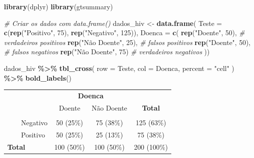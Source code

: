 \documentclass[
]{book}
\newenvironment{Shaded}{\begin{snugshade}}{\end{snugshade}}
\newcommand{\AttributeTok}[1]{\textcolor[rgb]{0.13,0.29,0.53}{#1}}
\newcommand{\CommentTok}[1]{\textcolor[rgb]{0.56,0.35,0.01}{\textit{#1}}}
\newcommand{\DecValTok}[1]{\textcolor[rgb]{0.00,0.00,0.81}{#1}}
\newcommand{\FunctionTok}[1]{\textcolor[rgb]{0.13,0.29,0.53}{\textbf{#1}}}
\newcommand{\NormalTok}[1]{#1}
\newcommand{\OtherTok}[1]{\textcolor[rgb]{0.56,0.35,0.01}{#1}}
\newcommand{\SpecialCharTok}[1]{\textcolor[rgb]{0.81,0.36,0.00}{\textbf{#1}}}
\newcommand{\StringTok}[1]{\textcolor[rgb]{0.31,0.60,0.02}{#1}}
\begin{document}
\begin{Shaded}
\begin{Highlighting}[]
\FunctionTok{library}\NormalTok{(dplyr)}
\FunctionTok{library}\NormalTok{(gtsummary)}

\CommentTok{\# Criar os dados com data.frame()}
\NormalTok{dados\_hiv }\OtherTok{\textless{}{-}} \FunctionTok{data.frame}\NormalTok{(}
  \AttributeTok{Teste =} \FunctionTok{c}\NormalTok{(}\FunctionTok{rep}\NormalTok{(}\StringTok{"Positivo"}\NormalTok{, }\DecValTok{75}\NormalTok{), }\FunctionTok{rep}\NormalTok{(}\StringTok{"Negativo"}\NormalTok{, }\DecValTok{125}\NormalTok{)),}
  \AttributeTok{Doenca =} \FunctionTok{c}\NormalTok{(}
    \FunctionTok{rep}\NormalTok{(}\StringTok{"Doente"}\NormalTok{, }\DecValTok{50}\NormalTok{),        }\CommentTok{\# verdadeiros positivos}
    \FunctionTok{rep}\NormalTok{(}\StringTok{"Não Doente"}\NormalTok{, }\DecValTok{25}\NormalTok{),    }\CommentTok{\# falsos positivos}
    \FunctionTok{rep}\NormalTok{(}\StringTok{"Doente"}\NormalTok{, }\DecValTok{50}\NormalTok{),        }\CommentTok{\# falsos negativos}
    \FunctionTok{rep}\NormalTok{(}\StringTok{"Não Doente"}\NormalTok{, }\DecValTok{75}\NormalTok{)     }\CommentTok{\# verdadeiros negativos }
\NormalTok{))}

\NormalTok{dados\_hiv }\SpecialCharTok{\%\textgreater{}\%}
  \FunctionTok{tbl\_cross}\NormalTok{(}
    \AttributeTok{row =}\NormalTok{ Teste,}
    \AttributeTok{col =}\NormalTok{ Doenca,}
    \AttributeTok{percent =} \StringTok{"cell"}
\NormalTok{  ) }\SpecialCharTok{\%\textgreater{}\%}
  \FunctionTok{bold\_labels}\NormalTok{()}
\end{Highlighting}
\end{Shaded}

\begin{table}[t]
\fontsize{12.0pt}{14.4pt}\selectfont
\begin{tabular*}{\linewidth}{@{\extracolsep{\fill}}lccc}
\toprule
 & \multicolumn{2}{c}{\textbf{Doenca}} &  \\ 
\cmidrule(lr){2-3}
 & Doente & Não Doente & \textbf{Total} \\ 
\midrule\addlinespace[2.5pt]
{\bfseries Teste} &  &  &  \\ 
    Negativo & 50 (25\%) & 75 (38\%) & 125 (63\%) \\ 
    Positivo & 50 (25\%) & 25 (13\%) & 75 (38\%) \\ 
{\bfseries Total} & 100 (50\%) & 100 (50\%) & 200 (100\%) \\ 
\bottomrule
\end{tabular*}
\end{table}
\end{document}
